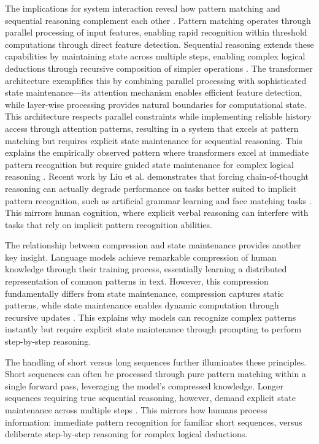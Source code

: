 \documentclass[12pt]{article}
\begin{document}
The implications for system interaction reveal how pattern matching and sequential reasoning complement each other \cite{wei2022chain}.
Pattern matching operates through parallel processing of input features, enabling rapid recognition within threshold computations through direct feature detection.
Sequential reasoning extends these capabilities by maintaining state across multiple steps, enabling complex logical deductions through recursive composition of simpler operations \cite{dickson2024trust}.
The transformer architecture exemplifies this by combining parallel processing with sophisticated state maintenance---its attention mechanism enables efficient feature detection, while layer-wise processing provides natural boundaries for computational state.
This architecture respects parallel constraints while implementing reliable history access through attention patterns, resulting in a system that excels at pattern matching but requires explicit state maintenance for sequential reasoning.
This explains the empirically observed pattern where transformers excel at immediate pattern recognition but require guided state maintenance for complex logical reasoning \cite{wei2022chain,liu2024mind}. Recent work by Liu et al. demonstrates that forcing chain-of-thought reasoning can actually degrade performance on tasks better suited to implicit pattern recognition, such as artificial grammar learning and face matching tasks \cite{liu2024mind}. This mirrors human cognition, where explicit verbal reasoning can interfere with tasks that rely on implicit pattern recognition abilities.

The relationship between compression and state maintenance provides another key insight.
Language models achieve remarkable compression of human knowledge through their training process, essentially learning a distributed representation of common patterns in text.
However, this compression fundamentally differs from state maintenance, compression captures static patterns, while state maintenance enables dynamic computation through recursive updates \cite{dickson2024trust}.
This explains why models can recognize complex patterns instantly but require explicit state maintenance through prompting to perform step-by-step reasoning.

The handling of short versus long sequences further illuminates these principles.
Short sequences can often be processed through pure pattern matching within a single forward pass, leveraging the model's compressed knowledge.
Longer sequences requiring true sequential reasoning, however, demand explicit state maintenance across multiple steps \cite{wei2022chain}.
This mirrors how humans process information: immediate pattern recognition for familiar short sequences, versus deliberate step-by-step reasoning for complex logical deductions.
\end{document}
